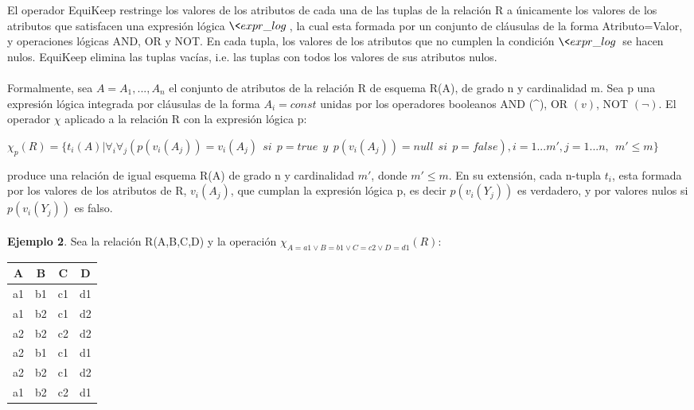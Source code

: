 \begin{enumerate}
\begin{enumerate}
El operador EquiKeep restringe los valores de los atributos de cada una de las tuplas de la relaci\'on R a
\'unicamente los valores de los atributos que satisfacen una expresi\'on l\'ogica $\<expr\_log\>$, la cual esta
formada por un conjunto de cl\'ausulas de la forma Atributo=Valor, y operaciones l\'ogicas AND, OR y NOT.
En cada tupla, los valores de los atributos que no cumplen la condici\'on $\<expr\_log\>$ se hacen nulos.
EquiKeep elimina las tuplas vac\'ias, i.e. las tuplas con todos los valores de sus atributos nulos.\\ \\
Formalmente, sea $A={A_{1},...,A_{n}}$ el conjunto de atributos de la relaci\'on R de esquema R(A), de grado n y
cardinalidad m. Sea p una expresi\'on l\'ogica integrada por cl\'ausulas de la forma $A_{i}=const$ unidas por los
operadores booleanos AND (\^{}), OR $(v)$, NOT $(\neg)$. El operador $\chi$ aplicado a la relaci\'on R con la
expresi\'on l\'ogica p:
\begin{center}
$\chi_{p}(R)=\{t_{i}(A)|\forall_{i}\forall_{j}(p(v_{i}(A_{j}))=v_{i}(A_{j})\ \ si\ \ p=true\ \ y\ \
p(v_{i}(A_{j}))=null\ \ si\ \ p=false),i=1...m',j=1...n,\ \ m'\leq m \}$
\end{center}
produce una relaci\'on de igual esquema R(A) de grado n y cardinalidad $m'$, donde $m'\leq m$. En su extensi\'on,
cada n-tupla $t_{i}$, esta formada por los valores de los atributos de R, $v_{i}(A_{j})$, que cumplan la
expresi\'on l\'ogica p, es decir $p(v_{i}(Y_{j}))$ es verdadero, y por valores nulos si $p(v_{i}(Y_{j}))$ es
falso.\\ \\
\textbf{Ejemplo 2}. Sea la relaci\'on R(A,B,C,D) y la operaci\'on $\chi_{A=a1 \lor B=b1 \lor C=c2 \lor
D=d1}(R)$:

\begin{center}
\begin{tabular}{|c|c|c|c|}\hline
\textbf{A} & \textbf{B} & \textbf{C} & \textbf{D}\\ \hline
a1 & b1 & c1 & d1\\ \hline
a1 & b2 & c1 & d2\\ \hline
a2 & b2 & c2 & d2\\ \hline
a2 & b1 & c1 & d1\\ \hline
a2 & b2 & c1 & d2\\ \hline
a1 & b2 & c2 & d1\\ \hline
\end{tabular}
\end{center}


\end{enumerate}
\end{enumerate}
